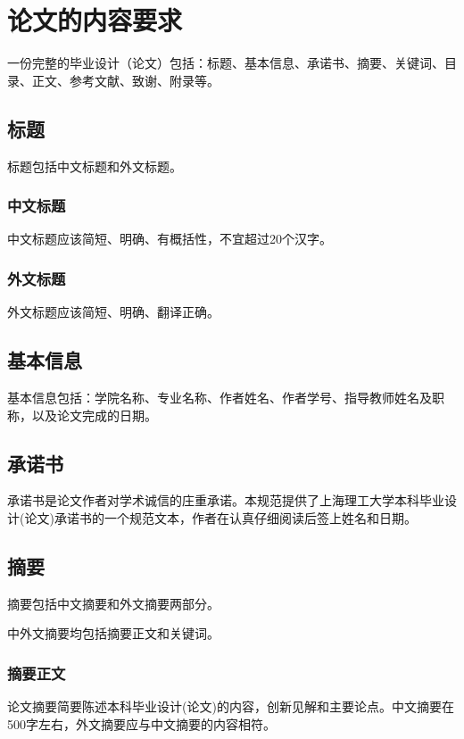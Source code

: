 \chapter{论文的内容要求}
\label{chap:contents}
\par {\bSong 一份完整的毕业设计（论文）包括：标题、基本信息、承诺书、摘要、关键词、目录、正文、参考文献、致谢、附录等。}

\section{标题}
\par 标题包括中文标题和外文标题。

\subsection{中文标题}
\par 中文标题应该简短、明确、有概括性，不宜超过20个汉字。

\subsection{外文标题}
\par 外文标题应该简短、明确、翻译正确。

\section{基本信息}
\par 基本信息包括：学院名称、专业名称、作者姓名、作者学号、指导教师姓名及职称，以及论文完成的日期。

\section{承诺书}
\par 承诺书是论文作者对学术诚信的庄重承诺。本规范提供了上海理工大学本科毕业设计(论文)承诺书的一个规范文本，作者在认真仔细阅读后签上姓名和日期。

\section{摘要}
\par 摘要包括中文摘要和外文摘要两部分。
\par 中外文摘要均包括摘要正文和关键词。

\subsection{摘要正文}
\par 论文摘要简要陈述本科毕业设计(论文)的内容，创新见解和主要论点。中文摘要在500字左右，外文摘要应与中文摘要的内容相符。

